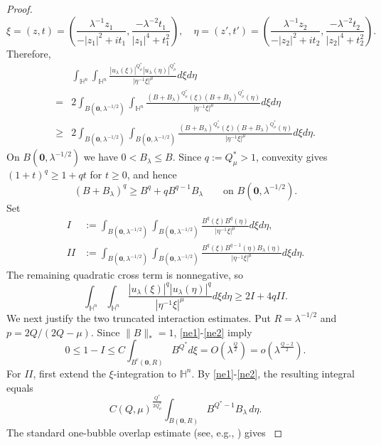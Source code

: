 \documentclass[11pt]{article}
\begin{document}
\begin{proof}
\begin{equation*}
 \xi= (z,t)=\left(\frac{\lambda^{-1}z_1}{-|z_1|^2+it_1},\frac{-\lambda^{-2}t_1}{|z_1|^4+t_1^2}\right),\quad
 \eta= (z',t')=\left(\frac{\lambda^{-1}z_2}{-|z_2|^2+it_2},\frac{-\lambda^{-2}t_2}{|z_2|^4+t_2^2}\right).
\end{equation*}
{Therefore,
\begin{align*}
 &\int_{\mathbb{H}^{n}}\int_{\mathbb{H}^{n}}\frac{|u_\lambda(\xi)|^{Q^{\ast}_{\mu}}|u_\lambda(\eta)|
 ^{Q^{\ast}_{\mu}}}{|\eta^{-1}\xi|^{\mu}}{d}\xi{d}\eta\\
 =&2\int_{B(\mathbf{0},\lambda^{-1/2})}\int_{\mathbb{H}^{n}}\frac{(B+B_\lambda)^{Q^{\ast}_{\mu}}(\xi)
 (B+B_\lambda)^{Q^{\ast}_{\mu}}(\eta)}{|\eta^{-1}\xi|^{\mu}}{d}\xi{d}\eta\\
 \geq&2\int_{B(\mathbf{0},\lambda^{-1/2})}\int_{B(\mathbf{0},\lambda^{-1/2})}\frac{(B+B_\lambda)^{Q^{\ast}_{\mu}}(\xi)
 (B+B_\lambda)^{Q^{\ast}_{\mu}}(\eta)}{|\eta^{-1}\xi|^{\mu}}{d}\xi{d}\eta.
\end{align*}
On $B(\mathbf{0},\lambda^{-1/2})$ we have $0<B_\lambda\leq B$. Since $q:=Q^{\ast}_{\mu}>1$, convexity gives $(1+t)^q\geq1+qt$ for $t\geq0$, and hence
\[
 (B+B_\lambda)^q\geq B^q+qB^{q-1}B_\lambda
 \qquad\text{on }B(\mathbf{0},\lambda^{-1/2}).
\]
Set
\begin{align*}
 I&:=\int_{B(\mathbf{0},\lambda^{-1/2})}\int_{B(\mathbf{0},\lambda^{-1/2})}
 \frac{B^q(\xi)B^q(\eta)}{|\eta^{-1}\xi|^\mu}{d}\xi{d}\eta,\\
 II&:=\int_{B(\mathbf{0},\lambda^{-1/2})}\int_{B(\mathbf{0},\lambda^{-1/2})}
 \frac{B^q(\xi)B^{q-1}(\eta)B_\lambda(\eta)}{|\eta^{-1}\xi|^\mu}{d}\xi{d}\eta.
\end{align*}
The remaining quadratic cross term is nonnegative, so
\begin{equation}\label{two-bubble-HLS-lower}
 \int_{\mathbb{H}^{n}}\int_{\mathbb{H}^{n}}\frac{|u_\lambda(\xi)|^q|u_\lambda(\eta)|^q}{|\eta^{-1}\xi|^\mu}{d}\xi{d}\eta
 \geq 2I+4qII.
\end{equation}
We next justify the two truncated interaction estimates. Put $R=\lambda^{-1/2}$ and
$p=2Q/(2Q-\mu)$. Since $\|B\|_*=1$, \eqref{ne1}-\eqref{ne2} imply
\[
 0\leq1-I\leq C\int_{B^c(\mathbf0,R)}B^{Q^{\ast}}d\xi
 =O\left(\lambda^{\frac{Q}{2}}\right)
 =o\!\left(\lambda^{\frac{Q-2}{2}}\right).
\]
For $II$, first extend the $\xi$-integration to $\mathbb H^n$. By \eqref{ne1}-\eqref{ne2}, the resulting integral equals
\[
 C(Q,\mu)^{\frac{Q^{\ast}}{2Q^{\ast}_{\mu}}}
 \int_{B(\mathbf0,R)}B^{Q^{\ast}-1}B_\lambda\,d\eta.
\]
The standard one-bubble overlap estimate (see, e.g., \cite[Proposition~3.1]{K25}) gives
}
\end{proof}
\end{document}
